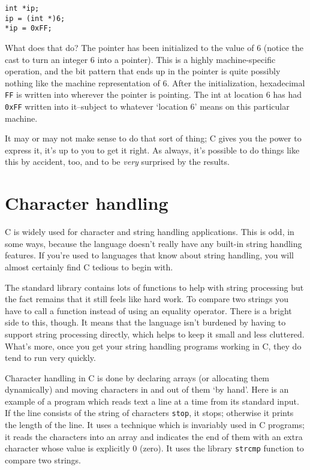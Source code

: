    \begin{Verbatim}
int *ip;
ip = (int *)6;
*ip = 0xFF;
\end{Verbatim}

   What does that do? The pointer has been initialized to the value of
    6 (notice the cast to turn an integer 6 into a pointer). This is
    a highly machine-specific operation, and the bit pattern that ends up in
    the pointer is quite possibly nothing like the machine representation of
    6.  After the initialization, hexadecimal \texttt{FF} is written into
    wherever the pointer is pointing. The int at location 6 has had
    \texttt{0xFF} written into it--subject to whatever
    `location 6' means on this particular machine.


   It may or may not make sense to do that sort of thing; C gives you the
    power to express it, it's up to you to get it right. As always, it's
    possible to do things like this by accident, too, and to be
    \textit{very} surprised by the results.


  
        \section{Character handling}
        

  

  C is widely used for character and string handling applications. This
   is odd, in some ways, because the language doesn't really have any
   built-in string handling features. If you're used to languages that know
   about string handling, you will almost certainly find C tedious to begin
   with.


  The standard library contains lots of functions to help with string
   processing but the fact remains that it still feels like hard work. To
   compare two strings you have to call a function instead of using an
   equality operator. There is a bright side to this, though. It means that
   the language isn't burdened by having to support string processing
   directly, which helps to keep it small and less cluttered. What's more,
   once you get your string handling programs working in C, they do tend to
   run very quickly.


  Character handling in C is done by declaring arrays (or allocating them
   dynamically) and moving characters in and out of them `by hand'.
   Here is an example of a program which reads text a line at a time from
   its standard input. If the line consists of the string of characters
   \texttt{stop}, it stops; otherwise it prints the length of the line.
   It uses a technique which is invariably used in C programs; it reads the
   characters into an array and indicates the end of them with an extra
   character whose value is explicitly 0 (zero). It uses the library
   \texttt{strcmp} function to compare two strings.


